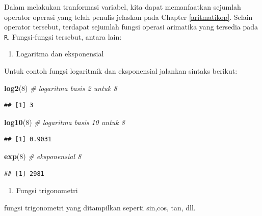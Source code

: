 \documentclass[12pt,]{krantz}
\newenvironment{Shaded}{\begin{snugshade}}{\end{snugshade}}
\newcommand{\CommentTok}[1]{\textcolor[rgb]{0.56,0.35,0.01}{\textit{#1}}}
\newcommand{\DecValTok}[1]{\textcolor[rgb]{0.00,0.00,0.81}{#1}}
\newcommand{\KeywordTok}[1]{\textcolor[rgb]{0.13,0.29,0.53}{\textbf{#1}}}
\newcommand{\NormalTok}[1]{#1}
\providecommand{\tightlist}{%
  \setlength{\itemsep}{0pt}\setlength{\parskip}{0pt}}
\begin{document}
Dalam melakukan tranformasi variabel, kita dapat memanfaatkan sejumlah operator operasi yang telah penulis jelaskan pada Chapter \ref{aritmatikop}. Selain operator tersebut, terdapat sejumlah fungsi operasi arimatika yang tersedia pada \texttt{R}. Fungsi-fungsi tersebut, antara lain:

\begin{enumerate}
\def\labelenumi{\arabic{enumi}.}
\tightlist
\item
  Logaritma dan eksponensial
\end{enumerate}

Untuk contoh fungsi logaritmik dan eksponensial jalankan sintaks berikut:

\begin{Shaded}
\begin{Highlighting}[]
\KeywordTok{log2}\NormalTok{(}\DecValTok{8}\NormalTok{) }\CommentTok{# logaritma basis 2 untuk 8}
\end{Highlighting}
\end{Shaded}

\begin{verbatim}
## [1] 3
\end{verbatim}

\begin{Shaded}
\begin{Highlighting}[]
\KeywordTok{log10}\NormalTok{(}\DecValTok{8}\NormalTok{) }\CommentTok{# logaritma basis 10 untuk 8}
\end{Highlighting}
\end{Shaded}

\begin{verbatim}
## [1] 0.9031
\end{verbatim}

\begin{Shaded}
\begin{Highlighting}[]
\KeywordTok{exp}\NormalTok{(}\DecValTok{8}\NormalTok{) }\CommentTok{# eksponensial 8}
\end{Highlighting}
\end{Shaded}

\begin{verbatim}
## [1] 2981
\end{verbatim}

\begin{enumerate}
\def\labelenumi{\arabic{enumi}.}
\setcounter{enumi}{1}
\tightlist
\item
  Fungsi trigonometri
\end{enumerate}

fungsi trigonometri yang ditampilkan seperti sin,cos, tan, dll.
\end{document}
